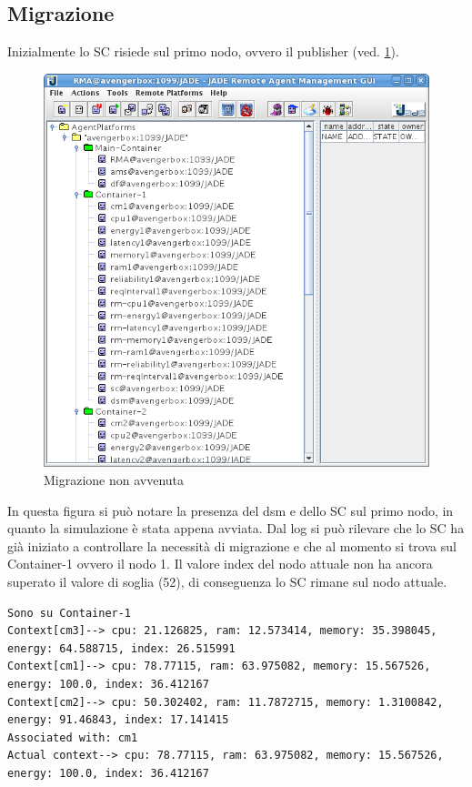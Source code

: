 \subsection{Migrazione}
Inizialmente lo SC risiede sul primo nodo, ovvero il publisher (ved. \ref{fig:primo}).
\begin{figure}[H]
\begin{center}
\includegraphics[scale=0.5]{etc/primo.png}
\caption{Migrazione non avvenuta}
\label{fig:primo}
\end{center}
\end{figure}
In questa figura si può notare la presenza del dsm e dello SC sul primo nodo, in quanto la simulazione è stata appena avviata. Dal log si può rilevare che lo SC ha già iniziato a controllare la necessità di migrazione e che al momento si trova sul Container-1 ovvero il nodo 1. Il valore index del nodo attuale non ha ancora superato il valore di soglia (52), di conseguenza lo SC rimane sul nodo attuale.
\begin{lstlisting}
Sono su Container-1
Context[cm3]--> cpu: 21.126825, ram: 12.573414, memory: 35.398045, energy: 64.588715, index: 26.515991
Context[cm1]--> cpu: 78.77115, ram: 63.975082, memory: 15.567526, energy: 100.0, index: 36.412167
Context[cm2]--> cpu: 50.302402, ram: 11.7872715, memory: 1.3100842, energy: 91.46843, index: 17.141415
Associated with: cm1
Actual context--> cpu: 78.77115, ram: 63.975082, memory: 15.567526, energy: 100.0, index: 36.412167
\end{lstlisting}
